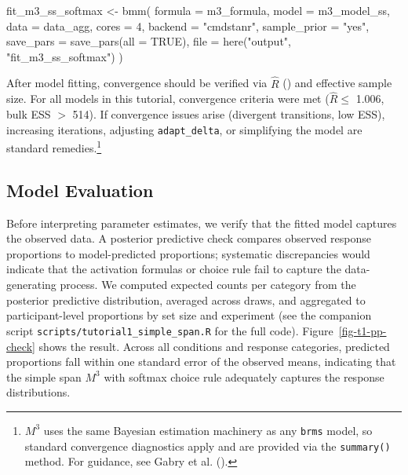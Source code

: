 \documentclass[
  man,
  floatsintext,
  longtable,
  nolmodern,
  notxfonts,
  notimes,
  colorlinks=true,linkcolor=blue,citecolor=blue,urlcolor=blue]{apa7}
\newenvironment{Shaded}{\begin{snugshade}}{\end{snugshade}}
\newcommand{\AttributeTok}[1]{\textcolor[rgb]{0.40,0.45,0.13}{#1}}
\newcommand{\ConstantTok}[1]{\textcolor[rgb]{0.56,0.35,0.01}{#1}}
\newcommand{\DecValTok}[1]{\textcolor[rgb]{0.68,0.00,0.00}{#1}}
\newcommand{\FunctionTok}[1]{\textcolor[rgb]{0.28,0.35,0.67}{#1}}
\newcommand{\NormalTok}[1]{\textcolor[rgb]{0.00,0.23,0.31}{#1}}
\newcommand{\OtherTok}[1]{\textcolor[rgb]{0.00,0.23,0.31}{#1}}
\newcommand{\StringTok}[1]{\textcolor[rgb]{0.13,0.47,0.30}{#1}}
\begin{document}
\begin{Shaded}
\begin{Highlighting}[]
\NormalTok{fit\_m3\_ss\_softmax }\OtherTok{\textless{}{-}} \FunctionTok{bmm}\NormalTok{(}
  \AttributeTok{formula      =}\NormalTok{ m3\_formula,}
  \AttributeTok{model        =}\NormalTok{ m3\_model\_ss,}
  \AttributeTok{data         =}\NormalTok{ data\_agg,}
  \AttributeTok{cores        =} \DecValTok{4}\NormalTok{,}
  \AttributeTok{backend      =} \StringTok{"cmdstanr"}\NormalTok{,}
  \AttributeTok{sample\_prior =} \StringTok{"yes"}\NormalTok{,}
  \AttributeTok{save\_pars    =} \FunctionTok{save\_pars}\NormalTok{(}\AttributeTok{all =} \ConstantTok{TRUE}\NormalTok{),}
  \AttributeTok{file         =} \FunctionTok{here}\NormalTok{(}\StringTok{"output"}\NormalTok{, }\StringTok{"fit\_m3\_ss\_softmax"}\NormalTok{)}
\NormalTok{)}
\end{Highlighting}
\end{Shaded}

After model fitting, convergence should be verified via \(\hat{R}\)
() and
effective sample size. For all models in this tutorial, convergence
criteria were met (\(\hat{R} \leq\) 1.006, bulk ESS \(>\) 514). If
convergence issues arise (divergent transitions, low ESS), increasing
iterations, adjusting \texttt{adapt\_delta}, or simplifying the model
are standard remedies.\footnote{\(M^3\) uses the same Bayesian
  estimation machinery as any \texttt{brms} model, so standard
  convergence diagnostics apply and are provided via the
  \texttt{summary()} method. For guidance, see Gabry et al.
  ().}

\subsection{Model Evaluation}\label{model-evaluation}

Before interpreting parameter estimates, we verify that the fitted model
captures the observed data. A posterior predictive check compares
observed response proportions to model-predicted proportions; systematic
discrepancies would indicate that the activation formulas or choice rule
fail to capture the data-generating process. We computed expected counts
per category from the posterior predictive distribution, averaged across
draws, and aggregated to participant-level proportions by set size and
experiment (see the companion script
\texttt{scripts/tutorial1\_simple\_span.R} for the full code).
Figure~\ref{fig-t1-pp-check} shows the result. Across all conditions and
response categories, predicted proportions fall within one standard
error of the observed means, indicating that the simple span \(M^3\)
with softmax choice rule adequately captures the response distributions.
\end{document}
